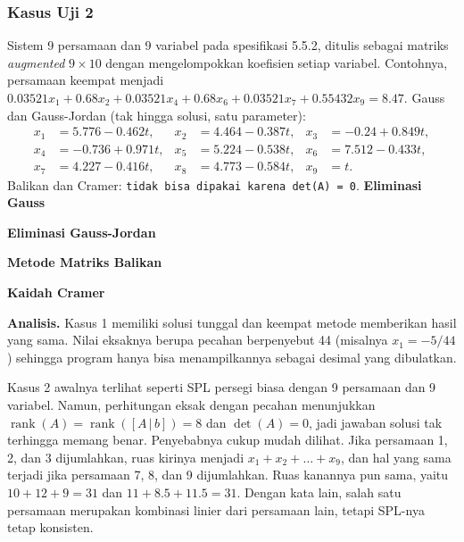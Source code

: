 \subsubsection{Kasus Uji 2}
\begin{kasus}
Sistem 9 persamaan dan 9 variabel pada spesifikasi 5.5.2, ditulis sebagai matriks \textit{augmented} $9 \times 10$ dengan mengelompokkan koefisien setiap variabel. Contohnya, persamaan keempat menjadi $0.03521x_1 + 0.68x_2 + 0.03521x_4 + 0.68x_6 + 0.03521x_7 + 0.55432x_9 = 8.47$.
Gauss dan Gauss-Jordan (tak hingga solusi, satu parameter):
\begin{align*}
x_1 &= 5.776 - 0.462t, & x_2 &= 4.464 - 0.387t, & x_3 &= -0.24 + 0.849t, \\
x_4 &= -0.736 + 0.971t, & x_5 &= 5.224 - 0.538t, & x_6 &= 7.512 - 0.433t, \\
x_7 &= 4.227 - 0.416t, & x_8 &= 4.773 - 0.584t, & x_9 &= t .
\end{align*}
Balikan dan Cramer: \texttt{tidak bisa dipakai karena det(A) = 0}.
\textbf{Eliminasi Gauss}

\textbf{Eliminasi Gauss-Jordan}

\textbf{Metode Matriks Balikan}

\textbf{Kaidah Cramer}
\end{kasus}

\textbf{Analisis.} Kasus 1 memiliki solusi tunggal dan keempat metode memberikan hasil yang sama. Nilai eksaknya berupa pecahan berpenyebut 44 (misalnya $x_1 = -5/44$) sehingga program hanya bisa menampilkannya sebagai desimal yang dibulatkan.

Kasus 2 awalnya terlihat seperti SPL persegi biasa dengan 9 persamaan dan 9 variabel. Namun, perhitungan eksak dengan pecahan menunjukkan $\operatorname{rank}(A) = \operatorname{rank}([A\,|\,b]) = 8$ dan $\det(A) = 0$, jadi jawaban solusi tak terhingga memang benar. Penyebabnya cukup mudah dilihat. Jika persamaan 1, 2, dan 3 dijumlahkan, ruas kirinya menjadi $x_1 + x_2 + \dots + x_9$, dan hal yang sama terjadi jika persamaan 7, 8, dan 9 dijumlahkan. Ruas kanannya pun sama, yaitu $10 + 12 + 9 = 31$ dan $11 + 8.5 + 11.5 = 31$. Dengan kata lain, salah satu persamaan merupakan kombinasi linier dari persamaan lain, tetapi SPL-nya tetap konsisten.

